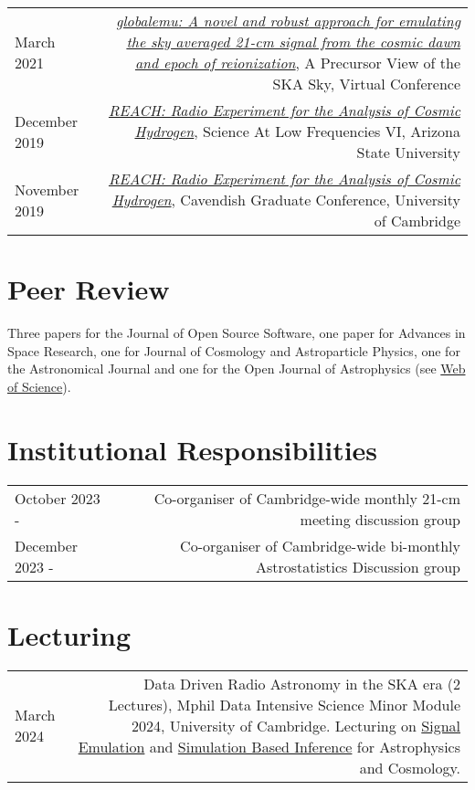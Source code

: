 \documentclass{article}
\begin{document}
\begin{tabular}{L!{\vrule}R}
	March 2021 & \href{https://github.com/htjb/Talks/blob/master/Posters/SKA_globalemu_March_2021/globalemu.pdf}{\textit{globalemu: A novel and robust approach for emulating the sky averaged 21-cm signal from the cosmic dawn and epoch of reionization}}, A Precursor View of the SKA Sky, Virtual Conference\\
	December 2019 & \href{https://drive.google.com/file/d/1dvgumyu4cXxXqoYxikU3DKOa4u_gpGzn/view}{\textit{REACH: Radio Experiment for the Analysis of Cosmic Hydrogen}}, Science At Low Frequencies VI, Arizona State University \\
	November 2019 & \href{https://github.com/htjb/Talks/blob/master/Posters/Cav_Graduate_Conf_REACH_Nov_2019/REACH_poster.pdf}{\textit{REACH: Radio Experiment for the Analysis of Cosmic Hydrogen}}, Cavendish Graduate Conference, University of Cambridge
\end{tabular}

\section*{Peer Review}
Three papers for the Journal of Open Source Software, one paper for Advances in Space Research, one for Journal of Cosmology and Astroparticle Physics, one for the Astronomical Journal and one for the Open Journal of Astrophysics (see \href{https://www.webofscience.com/wos/author/record/3920858}{Web of Science}).

\section*{Institutional Responsibilities}

\begin{tabular}{L!{\vrule}R}
    October 2023 - & Co-organiser of Cambridge-wide monthly 21-cm meeting discussion group \\
    December 2023 - & Co-organiser of Cambridge-wide bi-monthly Astrostatistics Discussion group \\
\end{tabular}

\section*{Lecturing}

\begin{tabular}{L!{\vrule}R}
    March 2024 & Data Driven Radio Astronomy in the SKA era (2 Lectures), Mphil Data Intensive Science Minor Module 2024, University of Cambridge. Lecturing on \href{https://github.com/htjb/Talks/raw/master/Lectures/MPhil_Data_Intensive_Science_Lectures_2024/Lecture-15.pdf}{Signal Emulation} and \href{https://github.com/htjb/Talks/raw/master/Lectures/MPhil_Data_Intensive_Science_Lectures_2024/Lecture-16.pdf}{Simulation Based Inference} for Astrophysics and Cosmology.
\end{tabular}
\end{document}

